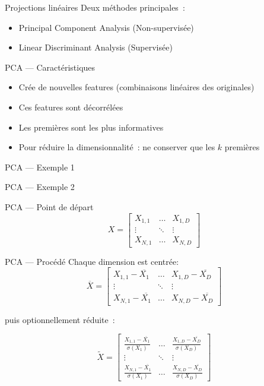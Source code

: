 \begin{frame}{Projections linéaires}
  Deux méthodes principales~:
  \begin{itemize}
    \item Principal Component Analysis (Non-supervisée)
    \item Linear Discriminant Analysis (Supervisée)
  \end{itemize}
\end{frame}

\begin{frame}{PCA --- Caractéristiques}
  \begin{itemize}[<+->]
    \item Crée de nouvelles features (combinaisons linéaires des originales)
    \item Ces features sont décorrélées
    \item Les premières sont les plus informatives
    \item Pour réduire la dimensionnalité~: ne conserver que les $k$ premières
  \end{itemize}
\end{frame}

\begin{frame}{PCA --- Exemple 1}
\end{frame}

\begin{frame}{PCA --- Exemple 2}
\end{frame}

\begin{frame}{PCA --- Point de départ}
  \[
  X = \begin{bmatrix}
    X_{1,1} & \dots  & X_{1,D} \\
    \vdots & \ddots & \vdots \\
    X_{N,1} & \dots  & X_{N,D}
  \end{bmatrix}
  \]
\end{frame}

\begin{frame}{PCA --- Procédé}
  Chaque dimension est centrée:
  \[
  \overline{X} =
  \begin{bmatrix}
    X_{1,1}-\overline{X_1} & \dots  & X_{1,D}-\overline{X_D} \\
    \vdots & \ddots & \vdots \\
    X_{N,1}-\overline{X_1} & \dots  & X_{N,D}-\overline{X_D}
  \end{bmatrix}
  \]

  puis optionnellement réduite~:

  \[
  \widetilde{X} =
  \begin{bmatrix}
    \frac{X_{1,1}-\overline{X_1}}{\sigma(X_1)} & \dots  & \frac{X_{1,D}-\overline{X_D}}{\sigma(X_D)} \\
    \vdots & \ddots & \vdots \\
    \frac{X_{N,1}-\overline{X_1}}{\sigma(X_1)} & \dots  & \frac{X_{N,D}-\overline{X_D}}{\sigma(X_D)}
  \end{bmatrix}
  \]
\end{frame}


